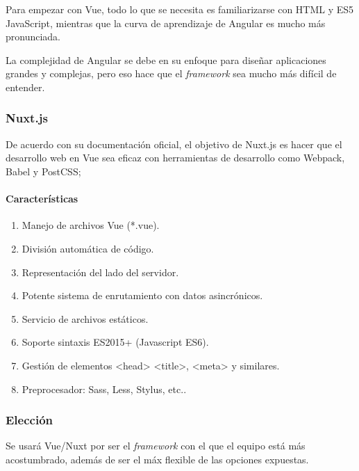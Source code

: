 Para empezar con Vue, todo lo que se necesita es familiarizarse con HTML y ES5 JavaScript, mientras que la curva de aprendizaje de Angular es mucho más pronunciada. 


La complejidad de Angular se debe en su enfoque para diseñar aplicaciones grandes y complejas, pero eso hace que el \textit{framework} sea mucho más difícil de entender.



\subsubsection*{Nuxt.js}
De acuerdo con su documentación oficial\cite{noauthor_what_nodate-1}, el objetivo de Nuxt.js es hacer que el desarrollo web en Vue sea eficaz con herramientas de desarrollo como Webpack, Babel y PostCSS; 

\paragraph*{Características}
\begin{enumerate}
    \item Manejo de archivos Vue (*.vue).
    \item División automática de código.
    \item Representación del lado del servidor.
    \item Potente sistema de enrutamiento con datos asincrónicos.
    \item Servicio de archivos estáticos.
    \item Soporte sintaxis ES2015+ (Javascript ES6).
    \item Gestión de elementos <head> <title>, <meta> y similares.
    \item Preprocesador: Sass, Less, Stylus, etc..
\end{enumerate}



\subsubsection*{Elección}

Se usará Vue/Nuxt por ser el \textit{framework} con el que el equipo está más acostumbrado, además de ser el máx flexible de las opciones expuestas.